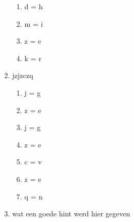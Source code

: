 \begin{enumerate}
  \begin{enumerate}
  \item d = h
  \item m = i
  \item z = e
  \item k = r
  \end{enumerate}
  \item jzjzczq
  \begin{enumerate}
  \item j = g
  \item z = e
  \item j = g
  \item z = e
  \item c = v
  \item z = e
  \item q = n
  \end{enumerate}
  \item wat een goede hint werd hier gegeven
\end{enumerate}